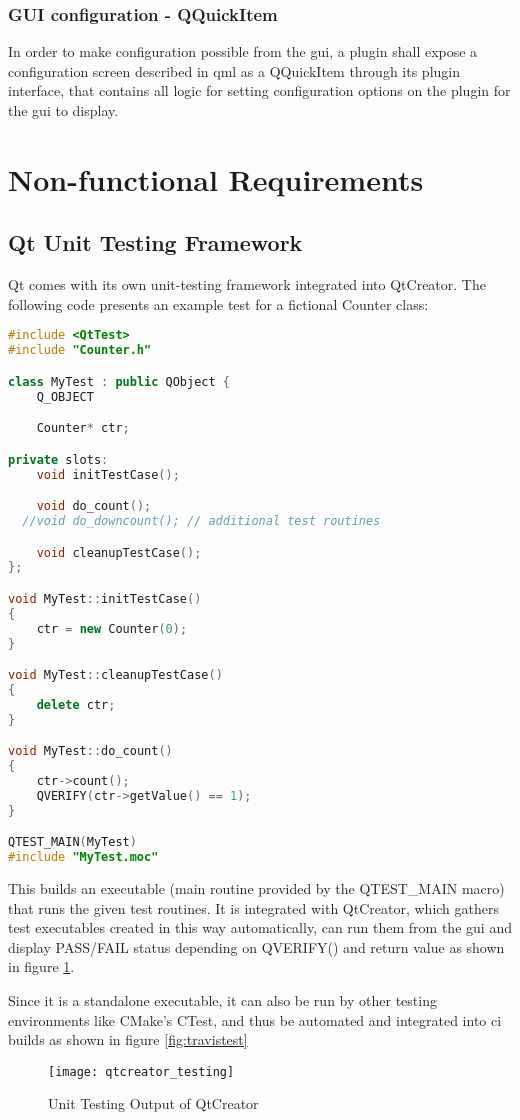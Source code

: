 \subsubsection{GUI configuration - QQuickItem}
In order to make configuration possible from the \gls{gui}, a plugin shall expose a configuration screen described in \gls{qml} as a QQuickItem through its plugin interface, that contains all logic for setting configuration options on the plugin for the \gls{gui} to display.

\section{Non-functional Requirements}

\subsection{Qt Unit Testing Framework}
Qt comes with its own unit-testing framework integrated into QtCreator. The following code presents an example test for a fictional Counter class:

\begin{lstlisting}[caption=Unit Test for a Counter class,language=c++]
#include <QtTest>
#include "Counter.h"

class MyTest : public QObject {
    Q_OBJECT

    Counter* ctr;

private slots:
    void initTestCase();

    void do_count();
  //void do_downcount(); // additional test routines

    void cleanupTestCase();
};

void MyTest::initTestCase()
{
	ctr = new Counter(0);
}

void MyTest::cleanupTestCase()
{
    delete ctr;
}

void MyTest::do_count()
{
	ctr->count();
	QVERIFY(ctr->getValue() == 1);
}

QTEST_MAIN(MyTest)
#include "MyTest.moc"
\end{lstlisting}

This builds an executable (main routine provided by the QTEST\_MAIN macro) that runs the given test routines.
It is integrated with QtCreator, which gathers test executables created in this way automatically, can run them from the \gls{gui} and display PASS/FAIL status depending on QVERIFY() and return value as shown in figure \ref{fig:qtctest}.

Since it is a standalone executable, it can also be run by other testing environments like CMake's CTest, and thus be automated and integrated into \gls{ci} builds as shown in figure \ref{fig:travistest}
\begin{figure}[htb]
	\texttt{[image: qtcreator\_testing]}
	\caption{Unit Testing Output of QtCreator}
	\label{fig:qtctest}
\end{figure}

